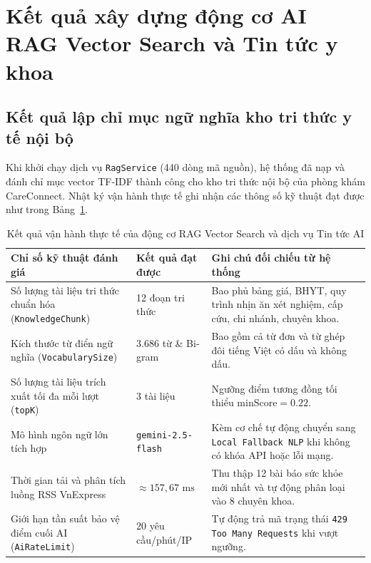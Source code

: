 \section{Kết quả xây dựng động cơ AI RAG Vector Search và Tin tức y khoa}

\subsection{Kết quả lập chỉ mục ngữ nghĩa kho tri thức y tế nội bộ}

Khi khởi chạy dịch vụ \texttt{RagService} (440 dòng mã nguồn), hệ thống đã nạp và đánh chỉ mục vector TF-IDF thành công cho kho tri thức nội bộ của phòng khám CareConnect. Nhật ký vận hành thực tế ghi nhận các thông số kỹ thuật đạt được như trong Bảng~\ref{tab:rag_results}.

\begin{table}[H]
\caption{Kết quả vận hành thực tế của động cơ RAG Vector Search và dịch vụ Tin tức AI}
\label{tab:rag_results}
\centering
\begin{tabular}{|p{5.5cm}|p{3.0cm}|p{5.5cm}|}
\hline
\textbf{Chỉ số kỹ thuật đánh giá} & \textbf{Kết quả đạt được} & \textbf{Ghi chú đối chiếu từ hệ thống} \\
\hline
Số lượng tài liệu tri thức chuẩn hóa (\texttt{KnowledgeChunk}) & 12 đoạn tri thức & Bao phủ bảng giá, BHYT, quy trình nhịn ăn xét nghiệm, cấp cứu, chi nhánh, chuyên khoa. \\
\hline
Kích thước từ điển ngữ nghĩa (\texttt{VocabularySize}) & 3.686 từ \& Bi-gram & Bao gồm cả từ đơn và từ ghép đôi tiếng Việt có dấu và không dấu. \\
\hline
Số lượng tài liệu trích xuất tối đa mỗi lượt (\texttt{topK}) & 3 tài liệu & Ngưỡng điểm tương đồng tối thiểu $\text{minScore} = 0.22$. \\
\hline
Mô hình ngôn ngữ lớn tích hợp & \texttt{gemini-2.5-flash} & Kèm cơ chế tự động chuyển sang \texttt{Local Fallback NLP} khi không có khóa API hoặc lỗi mạng. \\
\hline
Thời gian tải và phân tích luồng RSS VnExpress & $\approx 157{,}67\text{ ms}$ & Thu thập 12 bài báo sức khỏe mới nhất và tự động phân loại vào 8 chuyên khoa. \\
\hline
Giới hạn tần suất bảo vệ điểm cuối AI (\texttt{AiRateLimit}) & 20 yêu cầu/phút/IP & Tự động trả mã trạng thái \texttt{429 Too Many Requests} khi vượt ngưỡng. \\
\hline
\end{tabular}
\end{table}

